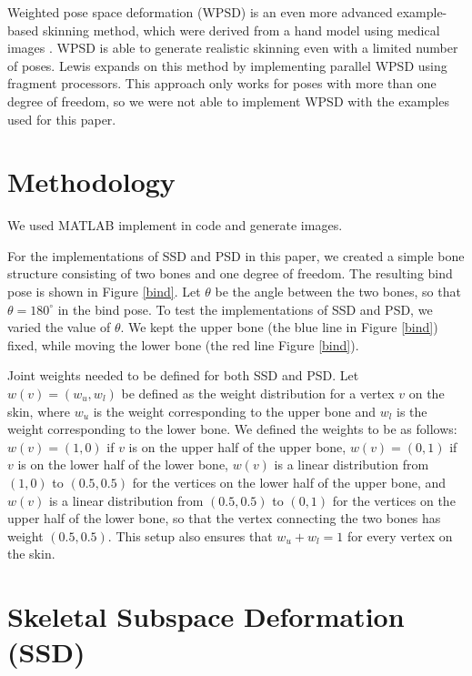 \documentclass[11pt,twocolumn,letterpaper]{article}
\begin{document}
Weighted pose space deformation (WPSD) is an even more advanced example-based skinning method, which were derived from a hand model using medical images \cite{kurihara2004modeling}. WPSD is able to generate realistic skinning even with a limited number of poses. Lewis \cite{rhee2006real} expands on this method by implementing parallel WPSD using fragment processors. This approach only works for poses with more than one degree of freedom, so we were not able to implement WPSD with the examples used for this paper.

\section{Methodology}

We used MATLAB implement in code and generate images.

For the implementations of SSD and PSD in this paper, we created a simple bone structure consisting of two bones and one degree of freedom. The resulting bind pose is shown in Figure \ref{bind}. Let $\theta$ be the angle between the two bones, so that $\theta = 180^{\circ}$ in the bind pose. To test the implementations of SSD and PSD, we varied the value of $\theta$. We kept the upper bone (the blue line in Figure \ref{bind}) fixed, while moving the lower bone (the red line Figure \ref{bind}).

Joint weights needed to be defined for both SSD and PSD. Let $w(v) = (w_u, w_l)$ be defined as the weight distribution for a vertex $v$ on the skin, where $w_u$ is the weight corresponding to the upper bone and $w_l$ is the weight corresponding to the lower bone. We defined the weights to be as follows: $w(v) = (1,0)$ if $v$ is on the upper half of the upper bone, $w(v) = (0,1)$ if $v$ is on the lower half of the lower bone, $w(v)$ is a linear distribution from $(1,0)$ to $(0.5,0.5)$ for the vertices on the lower half of the upper bone, and $w(v)$ is a linear distribution from $(0.5,0.5)$ to $(0,1)$ for the vertices on the upper half of the lower bone, so that the vertex connecting the two bones has weight $(0.5,0.5)$. This setup also ensures that $w_u + w_l = 1$ for every vertex on the skin.

\section{Skeletal Subspace Deformation (SSD)}
\end{document}
